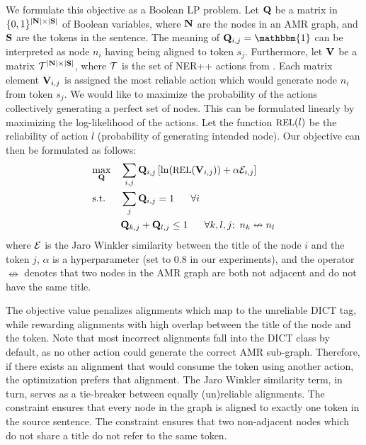 We formulate this objective as a Boolean LP problem.
Let $\mathbf{Q}$ be a matrix in $\{0,1\}^{|\mathbf{N}| \times |\mathbf{S}|}$ of Boolean variables,
  where $\mathbf{N}$ are the 
  nodes in an AMR graph, and $\mathbf{S}$ are the tokens in the sentence.
The meaning of $\bQ_{i,j} = \mathbbm{1}$ can be interpreted as node 
  $n_i$ having being aligned to token $s_j$.
Furthermore, let $\mathbf{V}$ be a matrix $\mathcal{T}^{|\mathbf{N}| \times |\mathbf{S}|}$, where
  $\mathcal{T}$ is the set of NER++ actions from .
Each matrix element $\mathbf{V}_{i,j}$ is assigned the most reliable action which would
  generate node $n_i$ from token $s_j$.
We would like to maximize the probability of the actions collectively generating a perfect set of nodes.
This can be formulated linearly by maximizing the log-likelihood of the actions.
Let the function $\textrm{\small{REL}}(l)$ be the reliability of action $l$ (probability of generating intended node).
Our objective can then be formulated as follows:
\begin{align}
  \label{eqn:objective}
  & \underset{\bQ}{\textrm{max}}
     & & \sum_{i,j} \bQ_{i,j} \left[ 
         \ln(\textrm{\small{REL}}(\bV_{i,j}))
         + \alpha \sE_{i,j} \right] \\
  \label{eqn:constraint1}
  & \textrm{s.t.}
     & & \sum_{j} \bQ_{i,j} = 1 ~~~~~ \forall i \\
  \label{eqn:constraint2}
  & & & \bQ_{k,j} + \bQ_{l,j} \leq 1 ~~~~~ \forall k,l,j; ~ n_k \nleftrightarrow n_l
\end{align}
where $\mathcal{E}$ is the Jaro Winkler similarity between the title of the node $i$ and the
  token $j$, $\alpha$ is a hyperparameter (set to 0.8 in our experiments),
  and the operator $\nleftrightarrow$ denotes that two nodes in the AMR graph are
  both not adjacent and do not have the same title.

The objective value penalizes alignments which map to the unreliable DICT tag,
  while rewarding alignments with high overlap between the title of the node and
  the token.
Note that most incorrect alignments fall into the DICT class by default, as no other
  action could generate the correct AMR sub-graph.
Therefore, if there exists an alignment that would consume the token using another
  action, the optimization prefers that alignment.
The Jaro Winkler similarity term, in turn, serves as a tie-breaker between equally
  (un)reliable alignments.
The constraint  ensures that every node in the graph is
  aligned to exactly one token in the source sentence.
The constraint  ensures that two non-adjacent nodes which do
  not share a title do not refer to the same token.

